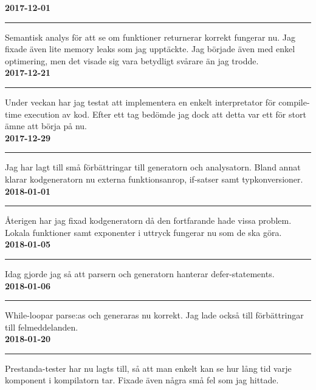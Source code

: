 \documentclass{theme}
\begin{document}
\noindent\textbf{2017-12-01}\\
\noindent\rule{\textwidth}{1pt}

\noindent 
Semantisk analys för att se om funktioner returnerar korrekt fungerar nu. Jag 
fixade även lite memory leaks som jag upptäckte. Jag började även med 
enkel optimering, men det visade sig vara betydligt svårare än jag trodde.\\

\noindent\textbf{2017-12-21}\\
\noindent\rule{\textwidth}{1pt}

\noindent 
Under veckan har jag testat att implementera en enkelt interpretator för 
compile-time execution av kod. Efter ett tag bedömde jag dock att detta var
ett för stort ämne att börja på nu. \\

\noindent\textbf{2017-12-29}\\
\noindent\rule{\textwidth}{1pt}

\noindent 
Jag har lagt till små förbättringar till generatorn och analysatorn. Bland annat 
klarar kodgeneratorn nu externa funktionsanrop, if-satser samt typkonversioner. 
\\

\noindent\textbf{2018-01-01}\\
\noindent\rule{\textwidth}{1pt}

\noindent 
Återigen har jag fixad kodgeneratorn då den fortfarande hade vissa problem. 
Lokala funktioner samt exponenter i uttryck fungerar nu som de ska göra.\\

\noindent\textbf{2018-01-05}\\
\noindent\rule{\textwidth}{1pt}

\noindent 
Idag gjorde jag så att parsern och generatorn hanterar defer-statements. \\

\noindent\textbf{2018-01-06}\\
\noindent\rule{\textwidth}{1pt}

\noindent 
While-loopar parse:as och generaras nu korrekt. Jag lade också till 
förbättringar till felmeddelanden.\\

\noindent\textbf{2018-01-20}\\
\noindent\rule{\textwidth}{1pt}

\noindent 
Prestanda-tester har nu lagts till, så att man enkelt kan se hur lång tid varje
komponent i kompilatorn tar. Fixade även några små fel som jag hittade.\\
\end{document}
